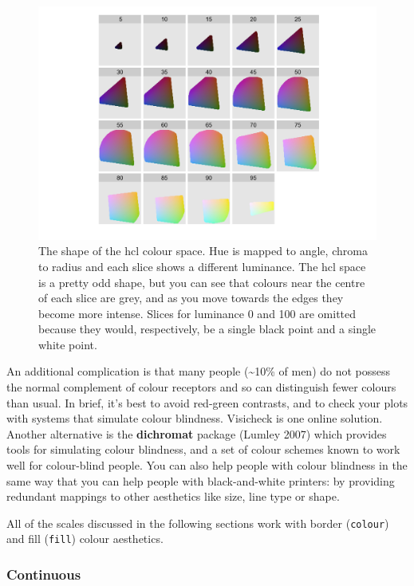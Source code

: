 \begin{figure}[htbp]
  \centering
    \includegraphics[width=\linewidth]{diagrams/hcl-space}
  \caption{The shape of the hcl colour space.  Hue is mapped to angle, chroma to radius and each slice shows a different luminance.  The hcl space is a pretty odd shape, but you can see that colours near the centre of each slice are grey, and as you move towards the edges they become more intense.  Slices for luminance 0 and 100 are omitted because they would, respectively, be a single black point and a single white point.}
  \label{fig:hcl}
\end{figure}

An additional complication is that many people (\textasciitilde{}10\% of
men) do not possess the normal complement of colour receptors and so can
distinguish fewer colours than usual.  In brief,
it's best to avoid red-green contrasts, and to check your plots with
systems that simulate colour blindness. Visicheck is one online
solution. Another alternative is the \textbf{dichromat} package (Lumley
2007) which provides tools for simulating colour blindness, and a set of
colour schemes known to work well for colour-blind people. You can also
help people with colour blindness in the same way that you can help
people with black-and-white printers: by providing redundant mappings to
other aesthetics like size, line type or shape.

All of the scales discussed in the following sections work with border
(\texttt{colour}) and fill (\texttt{fill}) colour aesthetics.

\subsubsection{Continuous}\label{ssub:colour-continuous}

